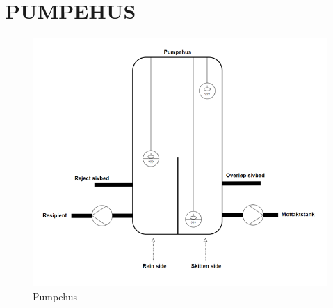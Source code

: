 \newpage
\section{PUMPEHUS}

\begin{figure}[htbp]
    \centering
    \includegraphics[width=1\textwidth]{Figurar/Pumpehus.png}
    \caption{Pumpehus}\label{fig:Pumpehus}
\end{figure}

